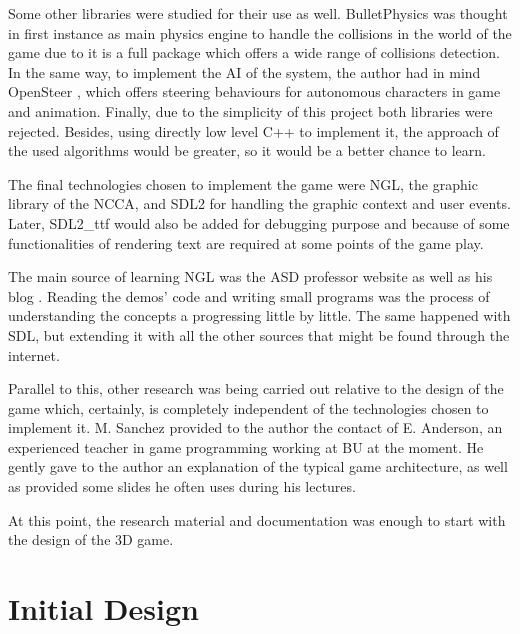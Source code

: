 \documentclass[]{article}
\begin{document}
 Some other libraries were studied for their use as well. BulletPhysics \cite{bulletPhysics} was thought in first instance as main physics engine to handle the collisions in the world of the game
 due to it is a full package which offers a wide range of collisions detection. In the same way, to implement the AI of the system, the author had in mind OpenSteer \cite{openSteer}, which offers
 steering behaviours for autonomous characters in game and animation. Finally, due to the simplicity of this project both libraries were rejected. Besides, using directly
 low level C++ to implement it, the approach of the used algorithms would be greater, so it would be a better chance to learn.
 
 The final technologies chosen to implement the game were NGL, the graphic library of the NCCA, and SDL2 for handling the graphic context and user events. Later, SDL2\_ttf would also be
 added for debugging purpose and because of some functionalities of rendering text are required at some points of the game play.
 
 The main source of learning NGL was the ASD professor website \cite{maceyWebsite} as well as his blog \cite{maceyBlog}. Reading the demos' code and writing small programs was the process of understanding the concepts a progressing 
 little by little. The same happened with SDL, but extending it with all the other sources that might be found through the internet.
 
 Parallel to this, other research was being carried out relative to the design of the game which, certainly, is completely independent of the technologies chosen to implement it. M. Sanchez provided
 to the author the contact of E. Anderson, an experienced teacher in game programming working at BU at the moment. He gently gave to the author an explanation of the typical game architecture, as well as provided 
 some slides he often uses during his lectures.
 
 At this point, the research material and documentation was enough to start with the design of the 3D game.

 

\section{Initial Design}
\end{document}
